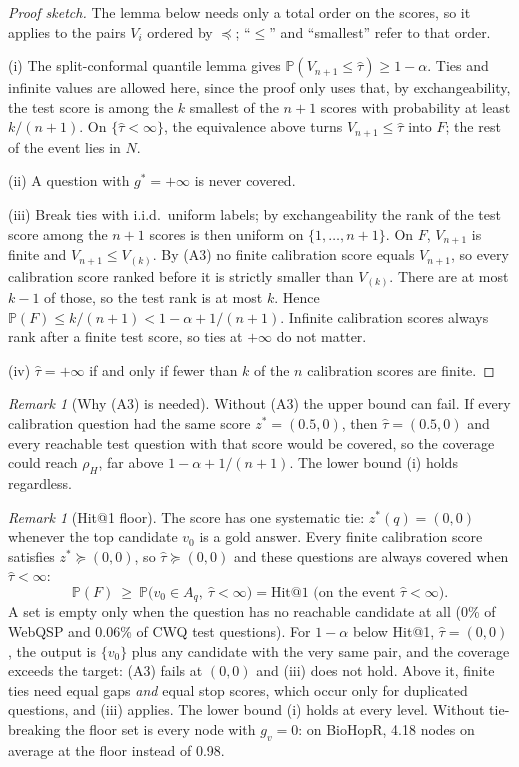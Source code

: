 \documentclass[11pt,a4paper]{article}
\theoremstyle{definition}
\theoremstyle{remark}
\newtheorem{remark}[theorem]{Remark}
\newcommand{\Prob}{\mathbb{P}}
\newcommand{\tauhat}{\hat{\tau}}
\begin{document}
\begin{proof}[Proof sketch]
The lemma below needs only a total order on the scores, so it applies to the pairs $V_i$ ordered by $\preceq$; ``$\le$'' and ``smallest'' refer to that order.

(i) The split-conformal quantile lemma gives $\Prob(V_{n+1}\le\tauhat)\ge1-\alpha$. Ties and infinite values are allowed here, since the proof only uses that, by exchangeability, the test score is among the $k$ smallest of the $n+1$ scores with probability at least $k/(n+1)$. On $\{\tauhat<\infty\}$, the equivalence above turns $V_{n+1}\le\tauhat$ into $F$; the rest of the event lies in $N$.

(ii) A question with $g^*=+\infty$ is never covered.

(iii) Break ties with i.i.d.\ uniform labels; by exchangeability the rank of the test score among the $n+1$ scores is then uniform on $\{1,\dots,n+1\}$. On $F$, $V_{n+1}$ is finite and $V_{n+1}\le V_{(k)}$. By (A3) no finite calibration score equals $V_{n+1}$, so every calibration score ranked before it is strictly smaller than $V_{(k)}$. There are at most $k-1$ of those, so the test rank is at most $k$. Hence $\Prob(F)\le k/(n+1)<1-\alpha+1/(n+1)$. Infinite calibration scores always rank after a finite test score, so ties at $+\infty$ do not matter.

(iv) $\tauhat=+\infty$ if and only if fewer than $k$ of the $n$ calibration scores are finite.
\end{proof}

\begin{remark}[Why (A3) is needed]
Without (A3) the upper bound can fail. If every calibration question had the same score $z^*=(0.5,0)$, then $\tauhat=(0.5,0)$ and every reachable test question with that score would be covered, so the coverage could reach $\rho_H$, far above $1-\alpha+1/(n+1)$. The lower bound (i) holds regardless.
\end{remark}

\begin{remark}[Hit@1 floor]\label{rem:floor}
The score has one systematic tie: $z^*(q)=(0,0)$ whenever the top candidate $v_0$ is a gold answer. Every finite calibration score satisfies $z^*\succeq(0,0)$, so $\tauhat\succeq(0,0)$ and these questions are always covered when $\tauhat<\infty$:
\[
\Prob(F)\ \ge\ \Prob\big(v_0\in A_q,\ \tauhat<\infty\big)=\text{Hit@1 (on the event }\tauhat<\infty).
\]
A set is empty only when the question has no reachable candidate at all (0\% of WebQSP and 0.06\% of CWQ test questions). For $1-\alpha$ below Hit@1, $\tauhat=(0,0)$, the output is $\{v_0\}$ plus any candidate with the very same pair, and the coverage exceeds the target: (A3) fails at $(0,0)$ and (iii) does not hold. Above it, finite ties need equal gaps \emph{and} equal stop scores, which occur only for duplicated questions, and (iii) applies. The lower bound (i) holds at every level. Without tie-breaking the floor set is every node with $g_v=0$: on BioHopR, 4.18 nodes on average at the floor instead of 0.98.
\end{remark}
\end{document}

